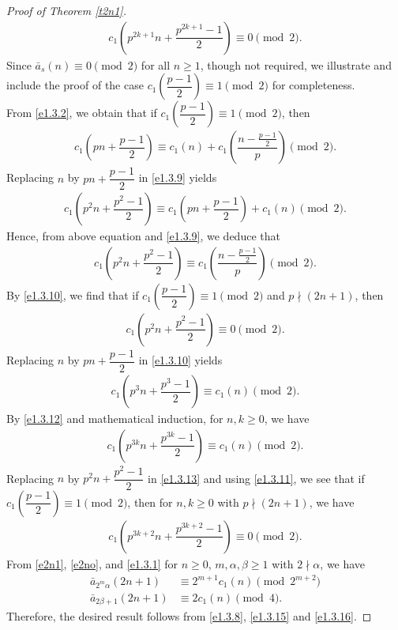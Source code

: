 \documentclass[11pt,a4paper]{article}
\numberwithin{equation}{section}
\theoremstyle{plain}
\begin{document}
\begin{proof}[Proof of Theorem \ref{t2n1}\unskip]
\begin{align}\label{e1.3.8}
c_1\left(p^{2k+1}n+\dfrac{p^{2k+1}-1}{2}\right)\equiv 0\pmod 2.
\end{align}
Since $\bar{a}_s(n)\equiv 0\pmod2$ for all $n\ge 1$, though not required, we illustrate and include the proof of the case $c_1\left(\dfrac{p-1}{2}\right)\equiv 1\pmod 2$ for completeness.\\
From \eqref{e1.3.2}, we obtain that if $c_1\left(\dfrac{p-1}{2}\right)\equiv 1\pmod 2$, then 
\begin{align}\label{e1.3.9}
c_1\left(pn+\dfrac{p-1}{2}\right)\equiv c_1(n)+c_1\left(\dfrac{n-\frac{p-1}{2}}{p}\right)\pmod 2.
\end{align}
Replacing $n$ by $pn+\dfrac{p-1}{2}$ in \eqref{e1.3.9} yields
\begin{align*}
c_1\left(p^2n+\dfrac{p^2-1}{2}\right)\equiv c_1\left(pn+\dfrac{p-1}{2}\right)+c_1(n)\pmod 2.
\end{align*}
Hence, from above equation and \eqref{e1.3.9}, we deduce that
\begin{align}\label{e1.3.10}
c_1\left(p^2n+\dfrac{p^2-1}{2}\right)\equiv c_1\left(\dfrac{n-\frac{p-1}{2}}{p}\right)\pmod 2.
\end{align}
By \eqref{e1.3.10}, we find that if $c_1\left(\dfrac{p-1}{2}\right)\equiv 1\pmod 2$ and $p\nmid(2n+1)$, then 
\begin{align}\label{e1.3.11}
c_1\left(p^2n+\dfrac{p^2-1}{2}\right)\equiv 0\pmod 2.
\end{align}
Replacing $n$ by $pn+\dfrac{p-1}{2}$ in \eqref{e1.3.10} yields
\begin{align}\label{e1.3.12}
c_1\left(p^3n+\dfrac{p^3-1}{2}\right)\equiv c_1(n)\pmod 2.
\end{align}
By \eqref{e1.3.12} and mathematical induction, for $n,k\ge 0$, we have
\begin{align}\label{e1.3.13}
c_1\left(p^{3k}n+\dfrac{p^{3k}-1}{2}\right)\equiv c_1(n)\pmod 2.
\end{align}
Replacing $n$ by $p^2n+\dfrac{p^2-1}{2}$ in \eqref{e1.3.13} and using \eqref{e1.3.11}, we see that if $c_1\left(\dfrac{p-1}{2}\right)\equiv 1\pmod 2$, then for $n,k\ge 0$ with $p\nmid (2n+1)$, we have
\begin{align}\label{e1.3.14}
c_1\left(p^{3k+2}n+\dfrac{p^{3k+2}-1}{2}\right)\equiv 0\pmod 2.
\end{align}
From \eqref{e2n1}, \eqref{e2no}, and \eqref{e1.3.1} for $n\ge 0$, $m,\alpha,\beta\ge 1$ with $2\nmid\alpha$, we have
\begin{align}
\bar{a}_{2^m\alpha}(2n+1)&\equiv 2^{m+1}c_1(n)\pmod{2^{m+2}}\label{e1.3.15}\\
\bar{a}_{2\beta+1}(2n+1)&\equiv 2c_1(n)\pmod 4.\label{e1.3.16}
\end{align}
Therefore, the desired result follows from \eqref{e1.3.8}, \eqref{e1.3.15} and \eqref{e1.3.16}.
\end{proof}
\end{document}
